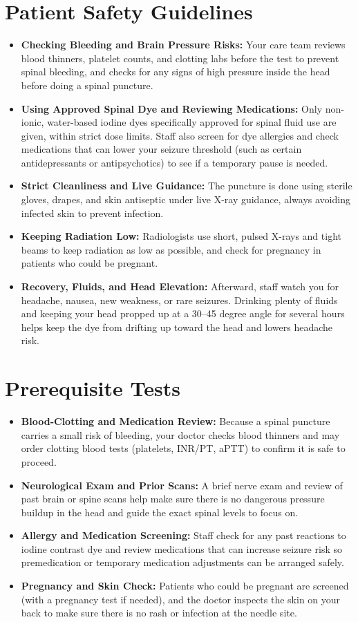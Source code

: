 \section{Patient Safety Guidelines}
\begin{itemize}
    \item \textbf{Checking Bleeding and Brain Pressure Risks:} Your care team reviews blood thinners, platelet counts, and clotting labs before the test to prevent spinal bleeding, and checks for any signs of high pressure inside the head before doing a spinal puncture.
    \item \textbf{Using Approved Spinal Dye and Reviewing Medications:} Only non-ionic, water-based iodine dyes specifically approved for spinal fluid use are given, within strict dose limits. Staff also screen for dye allergies and check medications that can lower your seizure threshold (such as certain antidepressants or antipsychotics) to see if a temporary pause is needed.
    \item \textbf{Strict Cleanliness and Live Guidance:} The puncture is done using sterile gloves, drapes, and skin antiseptic under live X-ray guidance, always avoiding infected skin to prevent infection.
    \item \textbf{Keeping Radiation Low:} Radiologists use short, pulsed X-rays and tight beams to keep radiation as low as possible, and check for pregnancy in patients who could be pregnant.
    \item \textbf{Recovery, Fluids, and Head Elevation:} Afterward, staff watch you for headache, nausea, new weakness, or rare seizures. Drinking plenty of fluids and keeping your head propped up at a 30--45 degree angle for several hours helps keep the dye from drifting up toward the head and lowers headache risk.
\end{itemize}

\section{Prerequisite Tests}
\begin{itemize}
    \item \textbf{Blood-Clotting and Medication Review:} Because a spinal puncture carries a small risk of bleeding, your doctor checks blood thinners and may order clotting blood tests (platelets, INR/PT, aPTT) to confirm it is safe to proceed.
    \item \textbf{Neurological Exam and Prior Scans:} A brief nerve exam and review of past brain or spine scans help make sure there is no dangerous pressure buildup in the head and guide the exact spinal levels to focus on.
    \item \textbf{Allergy and Medication Screening:} Staff check for any past reactions to iodine contrast dye and review medications that can increase seizure risk so premedication or temporary medication adjustments can be arranged safely.
    \item \textbf{Pregnancy and Skin Check:} Patients who could be pregnant are screened (with a pregnancy test if needed), and the doctor inspects the skin on your back to make sure there is no rash or infection at the needle site.
\end{itemize}

